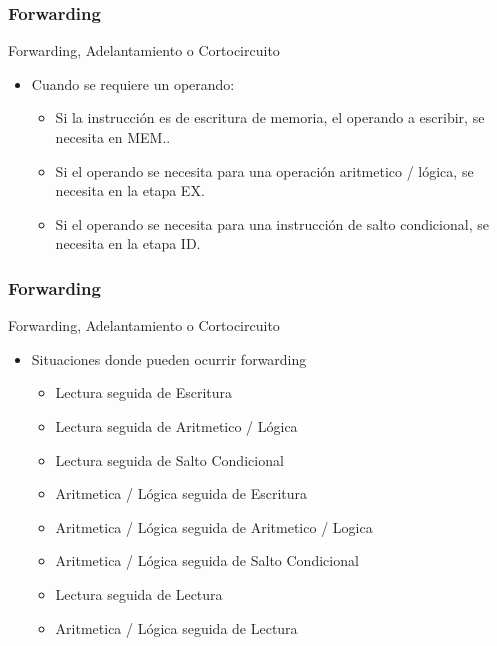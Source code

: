 \documentclass{beamer}
\begin{document}
\begin{frame}[fragile]
\frametitle{Forwarding}
Forwarding, Adelantamiento o Cortocircuito
\begin{itemize}
\item Cuando se requiere un operando:
\begin{itemize}
\item Si la instrucción es de escritura de memoria, el operando a escribir, se necesita en MEM..
\item Si el operando se necesita para una operación aritmetico / lógica, se necesita en la etapa EX.
\item Si el operando se necesita para una instrucción de salto condicional, se necesita en la etapa ID.
\end{itemize}
\end{itemize}
\end{frame}

\begin{frame}[fragile]
\frametitle{Forwarding}
Forwarding, Adelantamiento o Cortocircuito
\begin{itemize}
\item Situaciones donde pueden ocurrir forwarding
\begin{itemize}
\item Lectura seguida de Escritura
\item Lectura seguida de Aritmetico / Lógica
\item Lectura seguida de Salto Condicional
\item Aritmetica / Lógica seguida de Escritura
\item Aritmetica / Lógica seguida de Aritmetico / Logica
\item Aritmetica / Lógica seguida de Salto Condicional
\item Lectura seguida de Lectura 
\item Aritmetica / Lógica seguida de Lectura
\end{itemize}
\end{itemize}
\end{frame}
\end{document}
